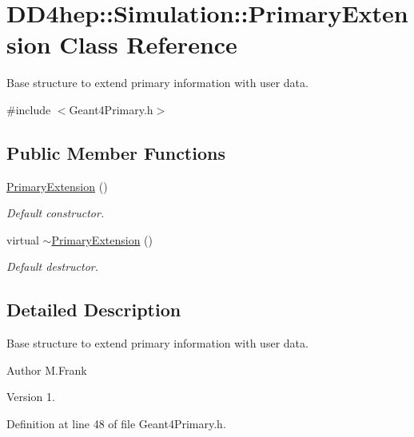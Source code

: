 \hypertarget{class_d_d4hep_1_1_simulation_1_1_primary_extension}{}\section{D\+D4hep\+:\+:Simulation\+:\+:Primary\+Extension Class Reference}
\label{class_d_d4hep_1_1_simulation_1_1_primary_extension}


Base structure to extend primary information with user data.  




{\ttfamily \#include $<$Geant4\+Primary.\+h$>$}

\subsection*{Public Member Functions}
\begin{DoxyCompactItemize}
\item 
\hyperlink{class_d_d4hep_1_1_simulation_1_1_primary_extension_af38d37160f1a2bcc08ac36aa866be163}{Primary\+Extension} ()
\begin{DoxyCompactList}\small\item\em Default constructor. \end{DoxyCompactList}\item 
virtual \hyperlink{class_d_d4hep_1_1_simulation_1_1_primary_extension_a5fb5927720e46d98279b72bfe42c061f}{$\sim$\+Primary\+Extension} ()
\begin{DoxyCompactList}\small\item\em Default destructor. \end{DoxyCompactList}\end{DoxyCompactItemize}


\subsection{Detailed Description}
Base structure to extend primary information with user data. 

\begin{DoxyAuthor}{Author}
M.\+Frank 
\end{DoxyAuthor}
\begin{DoxyVersion}{Version}
1. 
\end{DoxyVersion}


Definition at line 48 of file Geant4\+Primary.\+h.



